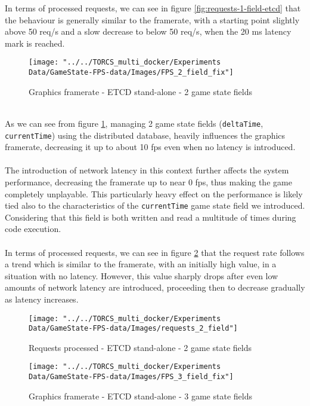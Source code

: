 In terms of processed requests, we can see in figure \ref{fig:requests-1-field-etcd} that the behaviour is generally similar to the framerate, with a starting point slightly above 50 req/s and a slow decrease to below 50 req/s, when the 20 ms latency mark is reached. \\
\begin{figure}[h!]
	\centering
	\texttt{[image: "../../TORCS\_multi\_docker/Experiments Data/GameState-FPS-data/Images/FPS\_2\_field\_fix"]}
	\caption[Graphics framerate - ETCD stand-alone - 2 game state fields]{Graphics framerate - ETCD stand-alone - 2 game state fields}
	\label{fig:fps-2-field-etcd}
\end{figure}
\\ As we can see from figure \ref{fig:fps-2-field-etcd}, managing 2 game state fields (\texttt{deltaTime}, \texttt{currentTime}) using the distributed database, heavily influences the graphics framerate, decreasing it up to about 10 fps even when no latency is introduced. \\ \\
The introduction of network latency in this context further affects the system performance, decreasing the framerate up to near 0 fps, thus making the game completely unplayable. This particularly heavy effect on the performance is likely tied also to the characteristics of the \texttt{currentTime} game state field we introduced. Considering that this field is both written and read a multitude of times during code execution. \\ \\
In terms of processed requests, we can see in figure \ref{fig:requests-2-field-etcd} that the request rate follows a trend which is similar to the framerate, with an initially high value, in a situation with no latency. However, this value sharply drops after even low amounts of network latency are introduced, proceeding then to decrease gradually as latency increases. \\
\begin{figure}[h!]
	\centering
	\texttt{[image: "../../TORCS\_multi\_docker/Experiments Data/GameState-FPS-data/Images/requests\_2\_field"]}
	\caption[Requests processed - ETCD stand-alone - 2 game state fields]{Requests processed - ETCD stand-alone - 2 game state fields}
	\label{fig:requests-2-field-etcd}
\end{figure}
\begin{figure}[h!]
	\centering
	\texttt{[image: "../../TORCS\_multi\_docker/Experiments Data/GameState-FPS-data/Images/FPS\_3\_field\_fix"]}
	\caption[Graphics framerate - ETCD stand-alone - 3 game state fields]{Graphics framerate - ETCD stand-alone - 3 game state fields}
	\label{fig:fps-3-field-etcd}
\end{figure}
